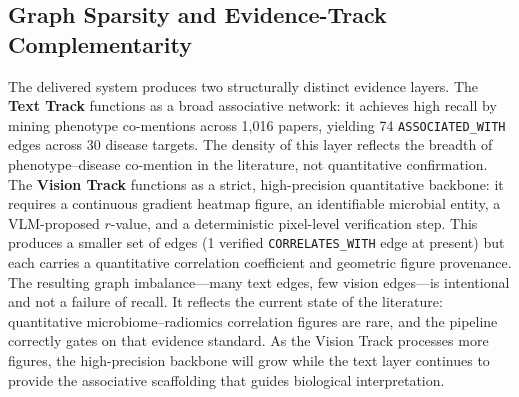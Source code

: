 \documentclass[12pt, letterpaper]{article}
\begin{document}
\subsection{Graph Sparsity and Evidence-Track Complementarity}

The delivered system produces two structurally distinct evidence layers. The \textbf{Text Track} functions as a broad associative network: it achieves high recall by mining phenotype co-mentions across 1,016 papers, yielding 74 \texttt{ASSOCIATED\_WITH} edges across 30 disease targets. The density of this layer reflects the breadth of phenotype–disease co-mention in the literature, not quantitative confirmation. The \textbf{Vision Track} functions as a strict, high-precision quantitative backbone: it requires a continuous gradient heatmap figure, an identifiable microbial entity, a VLM-proposed $r$-value, and a deterministic pixel-level verification step. This produces a smaller set of edges (1 verified \texttt{CORRELATES\_WITH} edge at present) but each carries a quantitative correlation coefficient and geometric figure provenance. The resulting graph imbalance—many text edges, few vision edges—is intentional and not a failure of recall. It reflects the current state of the literature: quantitative microbiome–radiomics correlation figures are rare, and the pipeline correctly gates on that evidence standard. As the Vision Track processes more figures, the high-precision backbone will grow while the text layer continues to provide the associative scaffolding that guides biological interpretation.
\end{document}
